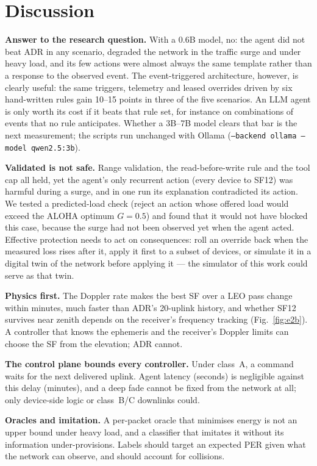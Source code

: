 \section{Discussion}
\label{sec:discussion}

\textbf{Answer to the research question.} With a 0.6B model, no: the agent did not beat ADR in any
scenario, degraded the network in the traffic surge and under heavy load, and its few actions were
almost always the same template rather than a response to the observed event. The event-triggered architecture, however,
is clearly useful: the same triggers, telemetry and leased overrides driven by six hand-written
rules gain 10--15 points in three of the five scenarios. An LLM agent is only worth its cost if it
beats that rule set, for instance on combinations of events that no rule anticipates. Whether a
3B--7B model clears that bar is the next measurement; the scripts run unchanged with Ollama
(\texttt{--backend ollama --model qwen2.5:3b}).

\textbf{Validated is not safe.} Range validation, the read-before-write rule and the tool cap all
held, yet the agent's only recurrent action (every device to SF12) was harmful during a surge, and in
one run its explanation contradicted its action. We tested a predicted-load check (reject an action whose
offered load would exceed the ALOHA optimum $G=0.5$) and found that it would not have blocked this
case, because the surge had not been observed yet when the agent acted. Effective protection needs
to act on consequences: roll an override back when the measured loss rises after it, apply it first
to a subset of devices, or simulate it in a digital twin of the network before applying it --- the
simulator of this work could serve as that twin.

\textbf{Physics first.} The Doppler rate makes the best SF over a LEO pass change within minutes,
much faster than ADR's 20-uplink history, and whether SF12 survives near zenith depends on the
receiver's frequency tracking (Fig.~\ref{fig:e2b}). A controller that knows the ephemeris and the
receiver's Doppler limits can choose the SF from the elevation; ADR cannot.

\textbf{The control plane bounds every controller.} Under class~A, a command waits for the next
delivered uplink. Agent latency (seconds) is negligible against this delay (minutes), and a deep
fade cannot be fixed from the network at all; only device-side logic or class~B/C downlinks could.

\textbf{Oracles and imitation.} A per-packet oracle that minimises energy is not an upper bound under
heavy load, and a classifier that imitates it without its information under-provisions. Labels
should target an expected PER given what the network can observe, and should account for collisions.

